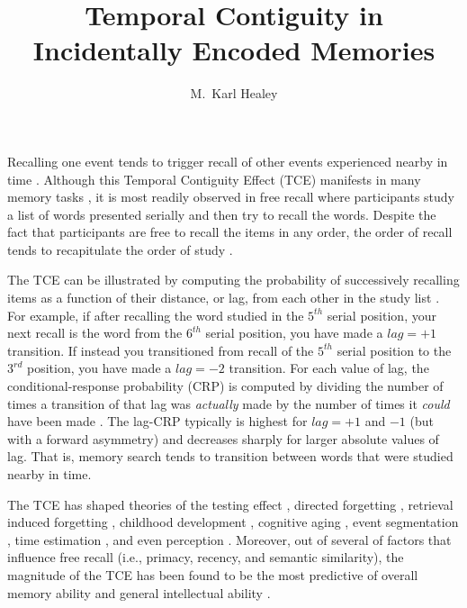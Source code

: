 \documentclass[man,natbib,floatsintext]{apa6} %
\title{Temporal Contiguity in Incidentally Encoded Memories}
\author{M.\ Karl Healey}
\affiliation{Michigan State University}
\begin{document}
\maketitle
\label{TODO-1}
\color{red}
Recalling one event tends to trigger recall of other events experienced nearby in time \citep[for a review, see][]{HealKaha17}. Although this Temporal Contiguity Effect (TCE) manifests in many memory tasks \citep{DaviEtal08,SchwEtal05}, it is most readily observed in free recall where participants study a list of words presented serially and then try to recall the words. Despite the fact that participants are free to recall the items in any order, the order of recall tends to recapitulate the order of study \citep{Murd74,Post71,Post72,Kaha96}. 

The TCE can be illustrated by computing the probability of successively recalling items as a function of their distance, or lag, from each other in the study list \citep{Kaha96}. For example, if after recalling the word studied in the $5^{th}$ serial position, your next recall is the word from the $6^{th}$ serial position, you have made a $lag=+1$ transition. If instead you transitioned from recall of the $5^{th}$ serial position to the $3^{rd}$ position, you have made a $lag=-2$ transition. For each value of lag, the conditional-response probability (CRP) is computed by dividing the number of times a transition of that lag was \emph{actually} made by the number of times it \emph{could} have been made \citep[e.g., if you have just recalled the last item in the list, it is not possible to make a $lag=+1$ transition. Transitions to already recalled items are also excluded from the counts as subjects rarely repeat items;][]{Kaha96}. The lag-CRP typically is highest for $lag=+1$ and $-1$ (but with a forward asymmetry) and decreases sharply for larger absolute values of lag. That is, memory search tends to transition between words that were studied nearby in time.

The TCE has shaped theories of the testing effect \citep{KarpEtal14}, directed forgetting \citep{SahaEtal13}, retrieval induced forgetting \citep{KlieBaum16}, childhood development \citep{JarroEtal15}, cognitive aging \citep{WahlHuff15,HealKaha15}, event segmentation \citep{EzzyDava14}, time estimation \citep{SahaSmit13}, and even perception \citep{TurkEtal12}. Moreover, out of several of factors that influence free recall (i.e., primacy, recency, and semantic similarity), the magnitude of the TCE has been found to be the most predictive of overall memory ability \citep{SedeEtal10,SpilUnsw11} and general intellectual ability \citep{HealEtal14}.
\end{document}
